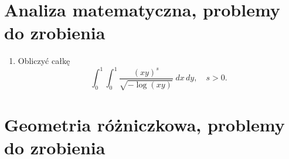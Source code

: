 \documentclass[a4paper,11pt]{article}
\begin{document}
\section{Analiza matematyczna, problemy do zrobienia}





\begin{enumerate}

\item Obliczyć całkę
  \begin{equation}
    \label{eq:Calculus-01}
    \int_{ 0 }^{ 1 } \int_{ 0 }^{ 1 } \frac{ ( x y )^{ s } }{ \sqrt{-\log( x y ) } }
      \; dx \, dy, \quad
      s > 0.
  \end{equation}



\end{enumerate}










\section{Geometria różniczkowa, problemy do zrobienia}


\end{document}

